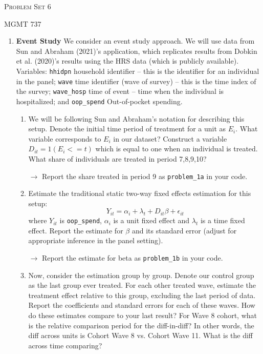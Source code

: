 \documentclass[11pt, a4paper]{article}
\begin{document}
\begin{center}
  {\Large \textsc{Problem Set 6}}

  MGMT 737
\end{center}



\begin{enumerate}
    \item\textbf{Event Study} We consider an event study
      approach. We will use data from Sun and Abraham (2021)'s
      application, which replicates results from Dobkin et al. (2020)'s
      results using the HRS data (which is publicly available). Variables:
      \texttt{hhidpn} household identifier -- this is the identifier for
      an individual in the panel; \texttt{wave} time identifier (wave of
      survey) -- this is the time index of the survey; \texttt{wave\_hosp}
      time of event -- time when the individual is hospitalized; and
      \texttt{oop\_spend} Out-of-pocket spending.
      \begin{enumerate}
      \item We will be following Sun and Abraham's notation for describing
        this setup. Denote the initial time period of treatment for a unit
        as $E_{i}$. What variable corresponds to $E_{i}$ in our dataset?
        Construct a variable $D_{it} = 1(E_{i} <= t)$ which is equal to
        one when an individual is treated. What share of individuals are
        treated in period 7,8,9,10?

        \hspace{10pt} $\rightarrow$ Report the share treated in period 9 as   \texttt{problem\_1a} in your code.  
      \item Estimate the traditional static two-way fixed effects
        estimation for this setup:
        \begin{equation}\label{eq:twfe}
          Y_{it} = \alpha_{i} + \lambda_{t} + D_{it}\beta + \epsilon_{it}
        \end{equation}
        where $Y_{it}$ is \texttt{oop\_spend}, $\alpha_{i}$ is a unit
        fixed effect and $\lambda_{t}$ is a time fixed effect. Report the
        estimate for $\beta$ and its standard error (adjust for
        appropriate inference in the panel setting). 

        \hspace{10pt} $\rightarrow$ Report the estimate for beta as   \texttt{problem\_1b} in your code.  
      \item Now, consider the estimation group by group. Denote our
        control group as the last group ever treated. For each other
        treated wave, estimate the treatment effect relative to this
        group, excluding the last period of data. Report the coefficients
        and standard errors for each of these waves. How do these
        estimates compare to your last result? For Wave 8 cohort, what is the
        relative comparison period for the diff-in-diff? In other words,
        the diff across units is Cohort Wave 8 vs. Cohort Wave 11. What is the diff across time comparing?


\end{enumerate}
\end{enumerate}
\end{document}
